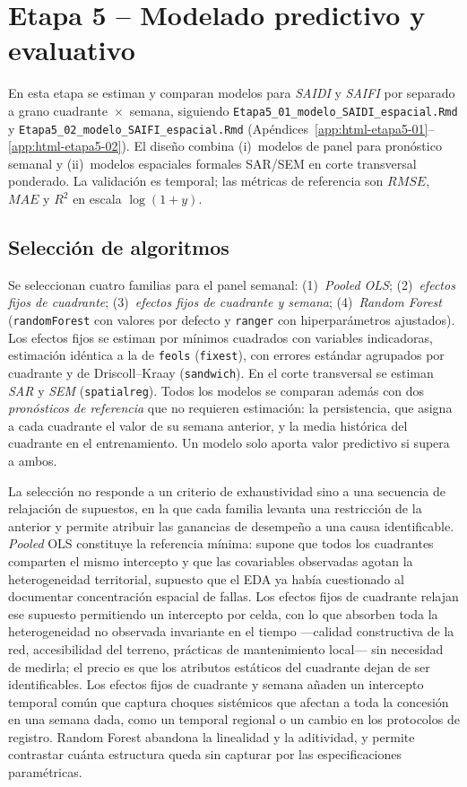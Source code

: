 \section{Etapa 5 – Modelado predictivo y evaluativo}
\label{sec:metodología-etapa5}

En esta etapa se estiman y comparan modelos para \textit{SAIDI} y \textit{SAIFI} por separado a grano cuadrante~$\times$~semana, siguiendo \texttt{Etapa5\_01\_modelo\_SAIDI\_espacial.Rmd} y \texttt{Etapa5\_02\_modelo\_SAIFI\_espacial.Rmd} (Apéndices~\ref{app:html-etapa5-01}--\ref{app:html-etapa5-02}). El diseño combina (i)~modelos de panel para pronóstico semanal y (ii)~modelos espaciales formales SAR/SEM en corte transversal ponderado. La validación es temporal; las métricas de referencia son $RMSE$, $MAE$ y $R^2$ en escala $\log(1+y)$.

\subsection{Selección de algoritmos}
\label{sec:seleccion_algoritmos}
Se seleccionan cuatro familias para el panel semanal: (1)~\textit{Pooled OLS}; (2)~\textit{efectos fijos de cuadrante}; (3)~\textit{efectos fijos de cuadrante y semana}; (4)~\textit{Random Forest} (\texttt{randomForest} con valores por defecto y \texttt{ranger} con hiperparámetros ajustados). Los efectos fijos se estiman por mínimos cuadrados con variables indicadoras, estimación idéntica a la de \texttt{feols} (\texttt{fixest}), con errores estándar agrupados por cuadrante y de Driscoll--Kraay (\texttt{sandwich}). En el corte transversal se estiman \textit{SAR} y \textit{SEM} (\texttt{spatialreg}). Todos los modelos se comparan además con dos \textit{pronósticos de referencia} que no requieren estimación: la persistencia, que asigna a cada cuadrante el valor de su semana anterior, y la media histórica del cuadrante en el entrenamiento. Un modelo solo aporta valor predictivo si supera a ambos.

La selección no responde a un criterio de exhaustividad sino a una secuencia de relajación de supuestos, en la que cada familia levanta una restricción de la anterior y permite atribuir las ganancias de desempeño a una causa identificable. \emph{Pooled} OLS constituye la referencia mínima: supone que todos los cuadrantes comparten el mismo intercepto y que las covariables observadas agotan la heterogeneidad territorial, supuesto que el EDA ya había cuestionado al documentar concentración espacial de fallas. Los efectos fijos de cuadrante relajan ese supuesto permitiendo un intercepto por celda, con lo que absorben toda la heterogeneidad no observada invariante en el tiempo —calidad constructiva de la red, accesibilidad del terreno, prácticas de mantenimiento local— sin necesidad de medirla; el precio es que los atributos estáticos del cuadrante dejan de ser identificables. Los efectos fijos de cuadrante y semana añaden un intercepto temporal común que captura choques sistémicos que afectan a toda la concesión en una semana dada, como un temporal regional o un cambio en los protocolos de registro. Random Forest abandona la linealidad y la aditividad, y permite contrastar cuánta estructura queda sin capturar por las especificaciones paramétricas.

